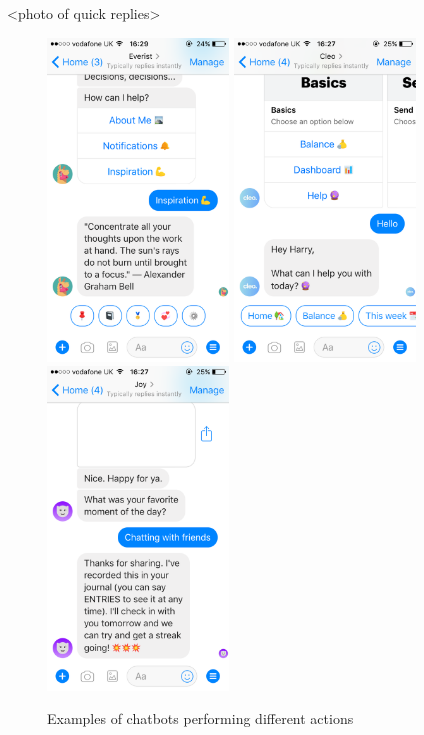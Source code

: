 <photo of quick replies>

\begin{figure}[H]
  \centering
  \includegraphics[width=1.9in]{../resources/existing-bots/everist.png}
  \hspace{10px}
  \includegraphics[width=1.9in]{../resources/existing-bots/cleo.png}
  \hspace{10px}
  \includegraphics[width=1.9in]{../resources/existing-bots/joy-ai.png}
  \caption{Examples of chatbots performing different actions}
  \label{fig:chatbots_examples}
\end{figure}


